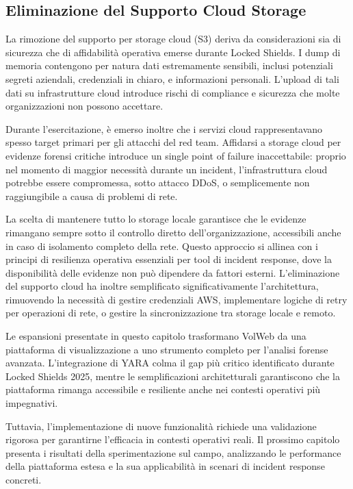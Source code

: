 \subsection{Eliminazione del Supporto Cloud Storage}

La rimozione del supporto per storage cloud (S3) deriva da considerazioni sia di sicurezza che di affidabilità operativa emerse durante Locked Shields. I dump di memoria contengono per natura dati estremamente sensibili, inclusi potenziali segreti aziendali, credenziali in chiaro, e informazioni personali. L'upload di tali dati su infrastrutture cloud introduce rischi di compliance e sicurezza che molte organizzazioni non possono accettare.

Durante l'esercitazione, è emerso inoltre che i servizi cloud rappresentavano spesso target primari per gli attacchi del red team. Affidarsi a storage cloud per evidenze forensi critiche introduce un single point of failure inaccettabile: proprio nel momento di maggior necessità durante un incident, l'infrastruttura cloud potrebbe essere compromessa, sotto attacco DDoS, o semplicemente non raggiungibile a causa di problemi di rete. 

La scelta di mantenere tutto lo storage locale garantisce che le evidenze rimangano sempre sotto il controllo diretto dell'organizzazione, accessibili anche in caso di isolamento completo della rete. Questo approccio si allinea con i principi di resilienza operativa essenziali per tool di incident response, dove la disponibilità delle evidenze non può dipendere da fattori esterni. L'eliminazione del supporto cloud ha inoltre semplificato significativamente l'architettura, rimuovendo la necessità di gestire credenziali AWS, implementare logiche di retry per operazioni di rete, o gestire la sincronizzazione tra storage locale e remoto.

Le espansioni presentate in questo capitolo trasformano VolWeb da una piattaforma di visualizzazione a uno strumento completo per l'analisi forense avanzata. L'integrazione di YARA colma il gap più critico identificato durante Locked Shields 2025, mentre le semplificazioni architetturali garantiscono che la piattaforma rimanga accessibile e resiliente anche nei contesti operativi più impegnativi. 

Tuttavia, l'implementazione di nuove funzionalità richiede una validazione rigorosa per garantirne l'efficacia in contesti operativi reali. Il prossimo capitolo presenta i risultati della sperimentazione sul campo, analizzando le performance della piattaforma estesa e la sua applicabilità in scenari di incident response concreti.